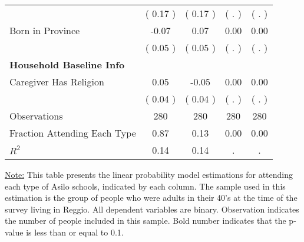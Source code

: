 \begin{table}[H]
{\begin{tabular}{lcccc}
\quad  & (     0.17 ) & (     0.17 )  & (        . )  & (        . )  \\
\quad Born in Province &     -0.07 &      0.07 &      0.00 &      0.00 \\
\quad  & (     0.05 ) & (     0.05 )  & (        . )  & (        . )  \\
\midrule
\textbf{Household Baseline Info} \\
\quad Caregiver Has Religion &      0.05 &     -0.05 &      0.00 &      0.00 \\
\quad  & (     0.04 ) & (     0.04 )  & (        . )  & (        . )  \\
\midrule
Observations & 280 & 280 & 280 & 280 \\
Fraction Attending Each Type &      0.87 &      0.13 &      0.00 &      0.00 \\
\midrule
$ R^2$ &      0.14 &      0.14 &         . &         . \\
\bottomrule
\end{tabular}}
\end{table}
\begin{footnotesize}
\noindent\underline{Note:} This table presents the linear probability model estimations for attending each type of Asilo schools, indicated by each column. The sample used in this estimation is the group of people who were adults in their 40's at the time of the survey living in Reggio. All dependent variables are binary. Observation indicates the number of people included in this sample. Bold number indicates that the p-value is less than or equal to 0.1.
\end{footnotesize}
